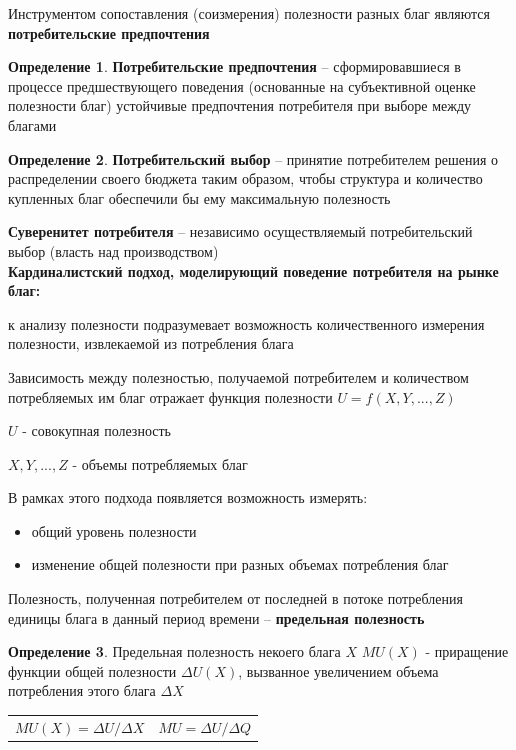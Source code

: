 \documentclass[reqno]{article}
\theoremstyle{definition}
\theoremstyle{definition}
\theoremstyle{definition}
\theoremstyle{definition}
\theoremstyle{definition}
\theoremstyle{definition}
\theoremstyle{definition}
\newtheorem*{defi}{Определение}
\theoremstyle{definition}
\theoremstyle{definition}
\begin{document}
			Инструментом сопоставления (соизмерения) полезности разных благ являются \textbf{потребительские предпочтения}
			
			\begin{defi}
				\textbf{Потребительские предпочтения} -- сформировавшиеся в процессе предшествующего поведения (основанные на субъективной оценке полезности благ) устойчивые предпочтения потребителя при выборе между благами
			\end{defi}
		
			\begin{defi}
				\textbf{Потребительский выбор} -- принятие потребителем решения о распределении своего бюджета таким образом, чтобы структура и количество купленных благ обеспечили бы ему максимальную полезность
			\end{defi}
		
			\textbf{Суверенитет потребителя} -- независимо осуществляемый потребительский выбор (власть над производством)\\
		
			\textbf{Кардиналистский подход, моделирующий поведение потребителя на рынке благ:}
			
			к анализу полезности подразумевает возможность количественного измерения полезности, извлекаемой из потребления блага 
			
			Зависимость между полезностью, получаемой потребителем и количеством потребляемых им благ отражает функция полезности $U = f(X,Y,...,Z)$
			
			$U$ - совокупная полезность
			
			$X,Y,...,Z$ - объемы потребляемых благ
			
			В рамках этого подхода появляется возможность измерять:
			
			\begin{itemize}
				\item общий уровень полезности
				
				\item изменение общей полезности при разных объемах потребления благ
			\end{itemize}
		
			Полезность, полученная потребителем от последней в потоке потребления единицы блага в данный период времени -- \textbf{предельная полезность}
			
			\begin{defi}
				Предельная полезность некоего блага $X$ $MU(X)$ - приращение функции общей полезности $\Delta U(X)$, вызванное увеличением объема потребления этого блага $\Delta X$
			\end{defi}
			\begin{table}[h!]
				\begin{center}
					\begin{tabular}{p{200pt} c}
						$MU(X)=\Delta U / \Delta X$ & $MU = \Delta U / \Delta Q$ \\
					\end{tabular}
				\end{center}
			\end{table}
			
\end{document}

